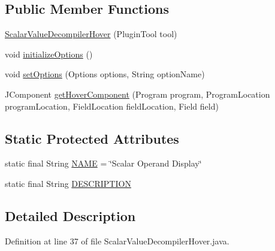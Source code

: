 \subsection*{Public Member Functions}
\begin{DoxyCompactItemize}
\item 
\mbox{\hyperlink{classghidra_1_1app_1_1decompiler_1_1component_1_1hover_1_1_scalar_value_decompiler_hover_ac35e423c075fefb547c665803aef2021}{Scalar\+Value\+Decompiler\+Hover}} (Plugin\+Tool tool)
\item 
void \mbox{\hyperlink{classghidra_1_1app_1_1decompiler_1_1component_1_1hover_1_1_scalar_value_decompiler_hover_a332d88d963bf72c85ed718bfd4bac6f0}{initialize\+Options}} ()
\item 
void \mbox{\hyperlink{classghidra_1_1app_1_1decompiler_1_1component_1_1hover_1_1_scalar_value_decompiler_hover_aac09a7fe4aa79b17e25e0a0ebc3e1510}{set\+Options}} (Options options, String option\+Name)
\item 
J\+Component \mbox{\hyperlink{classghidra_1_1app_1_1decompiler_1_1component_1_1hover_1_1_scalar_value_decompiler_hover_adceeff91735d2e79e45ddf1682273d66}{get\+Hover\+Component}} (Program program, Program\+Location program\+Location, Field\+Location field\+Location, Field field)
\end{DoxyCompactItemize}
\subsection*{Static Protected Attributes}
\begin{DoxyCompactItemize}
\item 
static final String \mbox{\hyperlink{classghidra_1_1app_1_1decompiler_1_1component_1_1hover_1_1_scalar_value_decompiler_hover_a5f64a9f4b002493455ec37a5e064f70b}{N\+A\+ME}} = \char`\"{}Scalar Operand Display\char`\"{}
\item 
static final String \mbox{\hyperlink{classghidra_1_1app_1_1decompiler_1_1component_1_1hover_1_1_scalar_value_decompiler_hover_adea165ba595260941166db8f52167d49}{D\+E\+S\+C\+R\+I\+P\+T\+I\+ON}}
\end{DoxyCompactItemize}


\subsection{Detailed Description}


Definition at line 37 of file Scalar\+Value\+Decompiler\+Hover.\+java.



